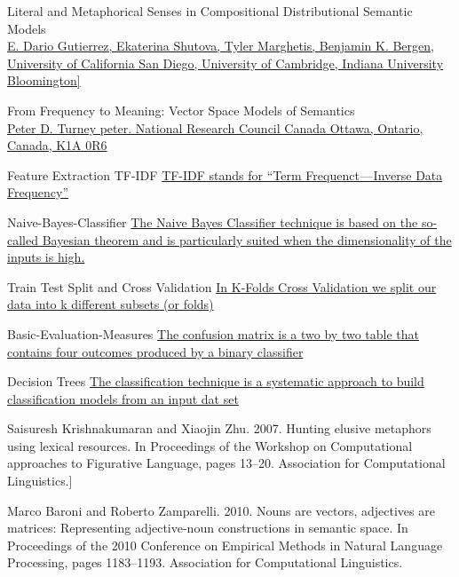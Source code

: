 \documentclass[a4paper]{article}
\begin{document}
\begin{thebibliography}{99}

Literal and Metaphorical Senses in Compositional Distributional Semantic Models  \\
\href{http://www.aclweb.org/anthology/P16-1018}
{\textrm{E. Dario Gutierrez, Ekaterina Shutova, Tyler Marghetis, Benjamin K. Bergen, University of California San Diego, University of Cambridge, Indiana University Bloomington]}}

From Frequency to Meaning: Vector Space Models of Semantics  \\
\href{https://www.microsoft.com/en-us/research/wp-content/uploads/2017/07/jair10.pdf}
\textrm{Peter D. Turney peter. National Research Council Canada Ottawa, Ontario, Canada, K1A 0R6}

Feature Extraction TF-IDF
\href{https://medium.freecodecamp.org/how-to-process-textual-data-using-tf-idf-in-python-cd2bbc0a94a3}
\textrm{TF-IDF stands for “Term Frequenct — Inverse Data Frequency”}

Naive-Bayes-Classifier
\href{http://www.statsoft.com/textbook/naive-bayes-classifier}
{\textrm{The Naive Bayes Classifier technique is based on the so-called Bayesian theorem and is particularly suited when the dimensionality of the inputs is high.}}

Train Test Split and Cross Validation
\href{https://towardsdatascience.com/train-test-split-and-cross-validation-in-python-80b61beca4b6}
\textrm{In K-Folds Cross Validation we split our data into k different subsets (or folds)}

Basic-Evaluation-Measures
\href{https://classeval.wordpress.com/introduction/basic-evaluation-measures/}
\textrm{The confusion matrix is a two by two table that contains four outcomes produced by a binary classifier}

Decision Trees
\href{http://mines.humanoriented.com/classes/2010/fall/csci568/portfolio_exports/lguo/decisionTree.html}
\textrm{The classification technique is a systematic approach to build classification models from an input dat set}

Saisuresh Krishnakumaran and Xiaojin Zhu. 2007.
{\textrm{Hunting elusive metaphors using lexical resources. In Proceedings of the Workshop on Computational approaches to Figurative Language, pages 13–20. Association for Computational Linguistics.]}}

Marco Baroni and Roberto Zamparelli. 2010.
\textrm{Nouns are vectors, adjectives are matrices: Representing adjective-noun constructions in semantic space. In Proceedings of the 2010 Conference on Empirical Methods in Natural Language Processing, pages 1183–1193. Association for Computational Linguistics.}


\end{thebibliography}
\end{document}
